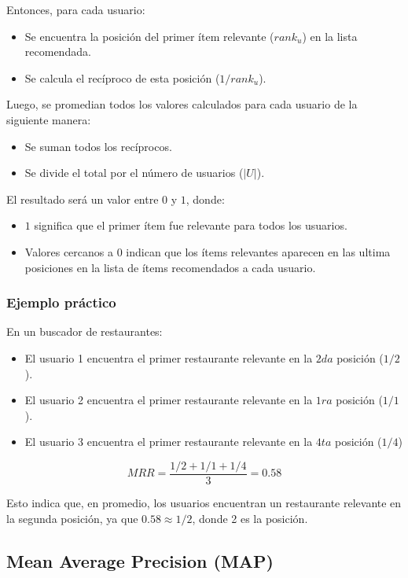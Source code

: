 \documentclass[11pt,a4paper,twoside]{thesis}
\begin{document}
Entonces, para cada usuario:

\begin{itemize}
	\item Se encuentra la posición del primer ítem relevante ($rank_u$) en la lista recomendada.
	\item Se calcula el recíproco de esta posición ($1/rank_u$).
\end{itemize}

Luego, se promedian todos los valores calculados para cada usuario de la siguiente manera:
\begin{itemize}
	\item Se suman todos los recíprocos.
	\item Se divide el total por el número de usuarios ($|U|$).
\end{itemize}

El resultado será un valor entre $0$ y $1$, donde:
\begin{itemize}
	\item $1$ significa que el primer ítem fue relevante para todos los usuarios.
	\item Valores cercanos a $0$ indican que los ítems relevantes aparecen en las ultima posiciones en la lista de ítems recomendados a cada usuario.
\end{itemize}


\subsubsection{Ejemplo práctico}

En un buscador de restaurantes:
\begin{itemize}
	\item El usuario 1 encuentra el primer restaurante relevante en la $2da$ posición ($1/2$).
	\item El usuario 2 encuentra el primer restaurante relevante en la $1ra$ posición ($1/1$).
	\item El usuario 3 encuentra el primer restaurante relevante en la $4ta$ posición ($1/4$)
\end{itemize}

\begin{equation}
	MRR = \frac{1/2 + 1/1 + 1/4}{3} = 0.58
\end{equation}

Esto indica que, en promedio, los usuarios encuentran un restaurante relevante en la segunda posición, ya que $0.58 \approx 1/2$, donde 2 es la posición.


\subsection{Mean Average Precision (MAP)}
\end{document}
